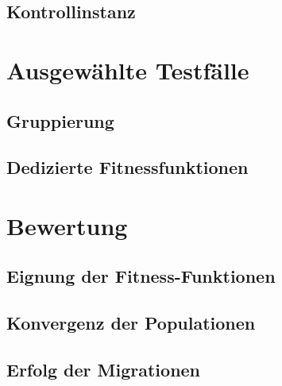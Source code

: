 \documentclass[12pt,a4paper]{article}
\begin{document}
\subsection{Kontrollinstanz}

\section{Ausgewählte Testfälle}
\subsection{Gruppierung}
\subsection{Dedizierte Fitnessfunktionen}

\section{Bewertung}
\subsection{Eignung der Fitness-Funktionen}
\subsection{Konvergenz der Populationen}
\subsection{Erfolg der Migrationen}
\end{document}
